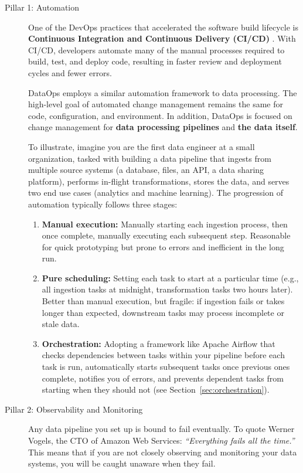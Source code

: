 \documentclass{article}
\begin{document}
\begin{description}
    \item[Pillar 1: Automation] One of the DevOps practices that accelerated the software build lifecycle is \textbf{Continuous Integration and Continuous Delivery (CI/CD)} \cite{humble2010continuous}. With CI/CD, developers automate many of the manual processes required to build, test, and deploy code, resulting in faster review and deployment cycles and fewer errors.

    DataOps employs a similar automation framework to data processing. The high-level goal of automated change management remains the same for code, configuration, and environment. In addition, DataOps is focused on change management for \textbf{data processing pipelines} and \textbf{the data itself}.

    To illustrate, imagine you are the first data engineer at a small organization, tasked with building a data pipeline that ingests from multiple source systems (a database, files, an API, a data sharing platform), performs in-flight transformations, stores the data, and serves two end use cases (analytics and machine learning). The progression of automation typically follows three stages:
    \begin{enumerate}
        \item \textbf{Manual execution:} Manually starting each ingestion process, then once complete, manually executing each subsequent step. Reasonable for quick prototyping but prone to errors and inefficient in the long run.
        \item \textbf{Pure scheduling:} Setting each task to start at a particular time (e.g., all ingestion tasks at midnight, transformation tasks two hours later). Better than manual execution, but fragile: if ingestion fails or takes longer than expected, downstream tasks may process incomplete or stale data.
        \item \textbf{Orchestration:} Adopting a framework like Apache Airflow that checks dependencies between tasks within your pipeline before each task is run, automatically starts subsequent tasks once previous ones complete, notifies you of errors, and prevents dependent tasks from starting when they should not (see Section~\ref{sec:orchestration}).
    \end{enumerate}

    \item[Pillar 2: Observability and Monitoring] Any data pipeline you set up is bound to fail eventually. To quote Werner Vogels, the CTO of Amazon Web Services: \textit{``Everything fails all the time.''} This means that if you are not closely observing and monitoring your data systems, you will be caught unaware when they fail.


\end{description}
\end{document}
